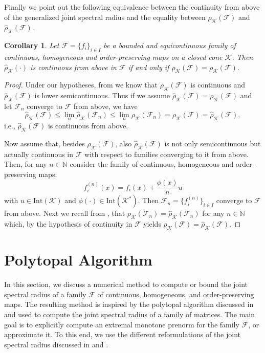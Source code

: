 \documentclass{article}
\newtheorem{corollary}[theorem]{Corollary}
\newcommand{\N}{\mathbb{N}}
\newcommand{\family}{\mathcal{F}}
\newcommand{\cradius}{\rho_{\cone}}
\newcommand{\cgradius}{\widehat{\rho}_{\cone}}
\newcommand{\cone}{\mathcal{K}}
\newcommand{\interior}{\mathrm{Int}}
\begin{document}
%
Finally we point out the following equivalence between the continuity from above of the generalized joint spectral radius and the equality between $\cradius(\family)$ and $\cgradius(\family)$.
%
%
\begin{corollary}\label{cor_continuity_of_spectral_radius}
    Let $\mathcal{F}=\{f_i\}_{i\in I}$ be a bounded and equicontinuous family of continuous, homogeneous and order-preserving maps on a closed cone $\cone$. Then $\cgradius(\cdot)$ is continuous from above in $\family$ if and only if $\cgradius(\family)=\cradius(\family)$. 
\end{corollary}
\begin{proof}
Under our hypotheses, from  we know that $\cradius(\family)$ is continuous and $\cgradius(\family)$ is lower semicontinuous. Thus if we assume $\cgradius(\family)=\cradius(\family)$ and let $\family_n$ converge to $\family$ from above, we have
\begin{equation}
\cgradius(\family)\leq \lim_n\cgradius(\family_n)\leq \lim_n\cradius(\family_n) = \cradius(\family)=\cgradius(\family),
\end{equation}
i.e., $\cgradius(\family)$ is continuous from above.
%

%
Now assume that, besides $\cradius(\family)$, also $\cgradius(\family)$ is not only semicontinuous but actually continuous in $\family$ with respect to families converging to it from above.
Then, for any $n\in \N$ consider the family of continuous, homogeneous and order-preserving maps:
\begin{equation}
    f_i^{(n)}(x)=f_i(x)+\frac{\phi(x)}{n}u
\end{equation}
    with $u\in \interior(\cone)$ and $\phi(\cdot)\in \interior(\cone^*)$. Then $\family_n=\{f_i^{(n)}\}_{i\in I}$ converge to $\family$ from above. Next we recall from , that $\cradius(\family_n)=\cgradius(\family_n)$ for any $n\in \N$ which, by the hypothesis of continuity in $\family$ yields $\cradius(\family)=\cgradius(\family)$. 
\end{proof}





\section{Polytopal Algorithm}\label{sec:polytopal_algorithm}

%
In this section, we discuss a numerical method to compute or bound the joint spectral radius of a family $\family$ of continuous, homogeneous, and order-preserving maps. The resulting method is inspired by the polytopal algorithm discussed in \cite{guglielmi2005complex, guglielmi2013exact} and used to compute the joint spectral radius of a family of matrices. The main goal is to explicitly compute an extremal monotone prenorm for the family $\family$, or approximate it. To this end, we use the different reformulations of the joint spectral radius discussed in  and .
\end{document}
